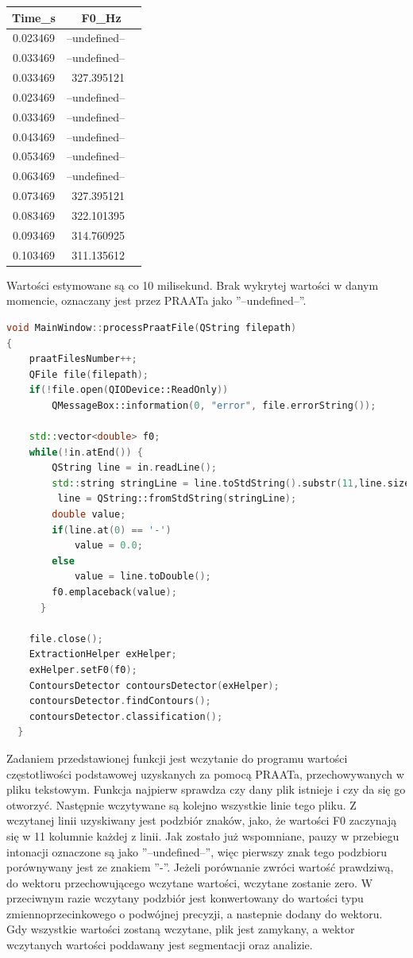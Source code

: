 \documentclass[a4paper,12 pt]{report}
\begin{document}
\begin{tabular}{c r @{} l}
Time\_s &
\multicolumn{2}{c}{F0\_Hz}\\ \hline
0.023469 & --undefined-- \\
0.033469 & --undefined-- \\
0.033469 & 327.395121 \\
0.023469 &  --undefined-- \\
0.033469 &  --undefined-- \\
0.043469 &  --undefined-- \\
0.053469 &  --undefined-- \\
0.063469 &  --undefined-- \\
0.073469 &  327.395121 \\
0.083469 &  322.101395 \\
0.093469 &  314.760925 \\
0.103469 &  311.135612 \\
\end{tabular}



Wartości estymowane są co 10 milisekund. Brak wykrytej wartości w danym momencie, oznaczany jest przez PRAATa jako ''--undefined--''.
\begin{lstlisting}[caption={Funkcja wczytująca do programu wartości F0 z pliku tekstowego},label={lst:label},language=C++]
void MainWindow::processPraatFile(QString filepath)
{
    praatFilesNumber++;
    QFile file(filepath);
    if(!file.open(QIODevice::ReadOnly)) 
        QMessageBox::information(0, "error", file.errorString());

    std::vector<double> f0;
    while(!in.atEnd()) {
        QString line = in.readLine();
        std::string stringLine = line.toStdString().substr(11,line.size());
         line = QString::fromStdString(stringLine);
        double value;
        if(line.at(0) == '-')
            value = 0.0;
        else
            value = line.toDouble();
        f0.emplaceback(value);
      }

    file.close();
    ExtractionHelper exHelper;
    exHelper.setF0(f0);
    ContoursDetector contoursDetector(exHelper);
    contoursDetector.findContours();
    contoursDetector.classification();
  }
\end{lstlisting}
Zadaniem przedstawionej funkcji jest wczytanie do programu wartości częstotliwości podstawowej uzyskanych za pomocą PRAATa, przechowywanych w pliku tekstowym. Funkcja najpierw sprawdza czy dany plik istnieje i czy da się go otworzyć. Następnie wczytywane są kolejno wszystkie linie tego pliku. Z wczytanej linii uzyskiwany jest podzbiór znaków, jako, że wartości F0 zaczynają się w 11 kolumnie każdej z linii. Jak zostało już wspomniane, pauzy w przebiegu intonacji oznaczone są jako ''--undefined--'', więc pierwszy znak tego podzbioru porównywany jest ze znakiem ''-''. Jeżeli porównanie zwróci wartość prawdziwą, do wektoru przechowującego wczytane wartości, wczytane zostanie zero. W przeciwnym razie wczytany podzbiór jest konwertowany do wartości typu zmiennoprzecinkowego o podwójnej precyzji, a nastepnie dodany do wektoru. Gdy wszystkie wartości zostaną wczytane, plik jest zamykany, a wektor wczytanych wartości poddawany jest segmentacji oraz analizie.
\end{document}
